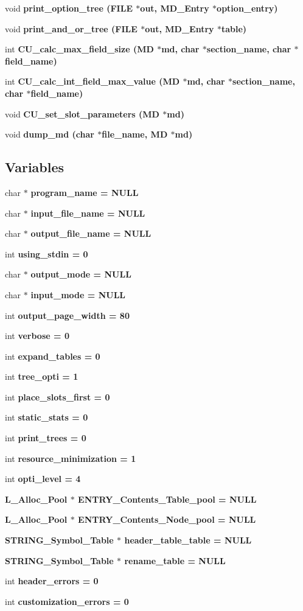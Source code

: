\begin{CompactItemize}
\item 
void \bf{print\_\-option\_\-tree} (FILE $\ast$out, \bf{MD\_\-Entry} $\ast$option\_\-entry)
\item 
void \bf{print\_\-and\_\-or\_\-tree} (FILE $\ast$out, \bf{MD\_\-Entry} $\ast$table)
\item 
int \bf{CU\_\-calc\_\-max\_\-field\_\-size} (\bf{MD} $\ast$md, char $\ast$section\_\-name, char $\ast$field\_\-name)
\item 
int \bf{CU\_\-calc\_\-int\_\-field\_\-max\_\-value} (\bf{MD} $\ast$md, char $\ast$section\_\-name, char $\ast$field\_\-name)
\item 
void \bf{CU\_\-set\_\-slot\_\-parameters} (\bf{MD} $\ast$md)
\item 
void \bf{dump\_\-md} (char $\ast$file\_\-name, \bf{MD} $\ast$md)
\end{CompactItemize}
\subsection*{Variables}
\begin{CompactItemize}
\item 
char $\ast$ \bf{program\_\-name} = \bf{NULL}
\item 
char $\ast$ \bf{input\_\-file\_\-name} = \bf{NULL}
\item 
char $\ast$ \bf{output\_\-file\_\-name} = \bf{NULL}
\item 
int \bf{using\_\-stdin} = 0
\item 
char $\ast$ \bf{output\_\-mode} = \bf{NULL}
\item 
char $\ast$ \bf{input\_\-mode} = \bf{NULL}
\item 
int \bf{output\_\-page\_\-width} = 80
\item 
int \bf{verbose} = 0
\item 
int \bf{expand\_\-tables} = 0
\item 
int \bf{tree\_\-opti} = 1
\item 
int \bf{place\_\-slots\_\-first} = 0
\item 
int \bf{static\_\-stats} = 0
\item 
int \bf{print\_\-trees} = 0
\item 
int \bf{resource\_\-minimization} = 1
\item 
int \bf{opti\_\-level} = 4
\item 
\bf{L\_\-Alloc\_\-Pool} $\ast$ \bf{ENTRY\_\-Contents\_\-Table\_\-pool} = \bf{NULL}
\item 
\bf{L\_\-Alloc\_\-Pool} $\ast$ \bf{ENTRY\_\-Contents\_\-Node\_\-pool} = \bf{NULL}
\item 
\bf{STRING\_\-Symbol\_\-Table} $\ast$ \bf{header\_\-table\_\-table} = \bf{NULL}
\item 
\bf{STRING\_\-Symbol\_\-Table} $\ast$ \bf{rename\_\-table} = \bf{NULL}
\item 
int \bf{header\_\-errors} = 0
\item 
int \bf{customization\_\-errors} = 0
\end{CompactItemize}


